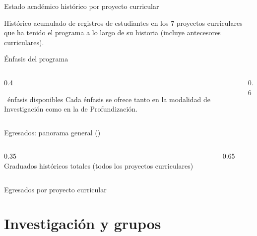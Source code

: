 \documentclass[aspectratio=169, 11pt]{beamer}
\begin{document}
\begin{frame}{Estado académico histórico por proyecto curricular}
  \centering
  \resizebox{0.92\linewidth}{!}{\ChartEstadoAcademico}
  \par
  \vspace{0.2cm}
  \small Histórico acumulado de \textbf{\TotalEstudiantesHistorico} registros de estudiantes en los 7 proyectos curriculares que ha tenido el programa a lo largo de su historia (incluye antecesores curriculares).
\end{frame}

\begin{frame}{Énfasis del programa}
  \begin{columns}[T]
    \begin{column}{0.4\textwidth}
      \begin{block}{\NumEnfasis\ énfasis disponibles}
        Cada énfasis se ofrece tanto en la modalidad de Investigación como en la de Profundización.
      \end{block}
    \end{column}
    \begin{column}{0.6\textwidth}
      \centering \footnotesize
      \TablaEnfasisTotales
    \end{column}
  \end{columns}
\end{frame}

\begin{frame}{Egresados: panorama general (\RangoEgresados)}
  \begin{columns}[T]
    \begin{column}{0.35\textwidth}
      \centering
      {\Huge \textbf{\color{udBlue}\TotalEgresadosHistorico}}\\
      \small Graduados históricos totales (todos los proyectos curriculares)
    \end{column}
    \begin{column}{0.65\textwidth}
      \resizebox{\linewidth}{!}{\ChartEgresadosAnio}
    \end{column}
  \end{columns}
\end{frame}

\begin{frame}{Egresados por proyecto curricular}
  \centering
  \resizebox{0.85\linewidth}{!}{\ChartEgresadosProyecto}
\end{frame}

\section{Investigación y grupos}
\end{document}
